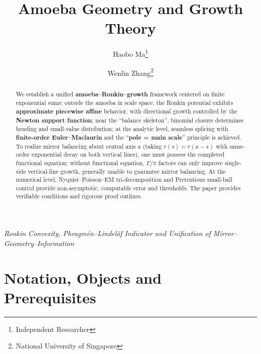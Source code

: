 \documentclass[11pt,a4paper]{article}
\title{Amoeba Geometry and Growth Theory}
\author{Haobo Ma\thanks{Independent Researcher} \and Wenlin Zhang\thanks{National University of Singapore}}
\date{}
\theoremstyle{remark}
\begin{document}
\maketitle

\begin{center}
\textit{Ronkin Convexity, Phragm\'en--Lindel\"of Indicator and Unification of Mirror--Geometry--Information}
\end{center}

\begin{abstract}
We establish a unified \textbf{amoeba--Ronkin--growth} framework centered on finite exponential sums: outside the amoeba in scale space, the Ronkin potential exhibits \textbf{approximate piecewise affine} behavior, with directional growth controlled by the \textbf{Newton support function}; near the ``balance skeleton'', binomial closure determines bending and small-value distribution; at the analytic level, seamless splicing with \textbf{finite-order Euler--Maclaurin} and the ``\textbf{pole = main scale}'' principle is achieved. To realize mirror balancing about central axis $a$ (taking $r(s)=r(a-s)$ with same-order exponential decay on both vertical lines), one must possess the completed functional equation; without functional equation, $\Gamma/\pi$ factors can only improve single-side vertical-line growth, generally unable to guarantee mirror balancing. At the numerical level, Nyquist--Poisson--EM tri-decomposition and Pretentious small-ball control provide non-asymptotic, computable error and thresholds. The paper provides verifiable conditions and rigorous proof outlines.
\end{abstract}

\section{Notation, Objects and Prerequisites}
\end{document}
